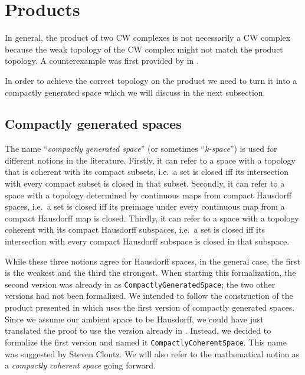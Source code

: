 \section{Products}\label{sec:products}

In general, the product of two CW complexes is not necessarily a CW complex because the weak topology of the CW complex might not match the product topology.
A counterexample was first provided by \citeauthor{Dowker1952} in \cite{Dowker1952}.

In order to achieve the correct topology on the product we need to turn it into a compactly generated space which we will discuss in the next subsection.

\subsection{Compactly generated spaces}

The name ``\emph{compactly generated space}'' (or sometimes ``\emph{k-space}'') is used for different notions in the literature.
Firstly, it can refer to a space with a topology that is coherent with its compact subsets, i.e.\ a set is closed iff its intersection with every compact subset is closed in that subset. 
Secondly, it can refer to a space with a topology determined by continuous maps from compact Hausdorff spaces, i.e.\ a set is closed iff its preimage under every continuous map from a compact Hausdorff map is closed. 
Thirdly, it can refer to a space with a topology coherent with its compact Hausdorff subspaces, i.e.\ a set is closed iff its intersection with every compact Hausdorff subspace is closed in that subspace. 

While these three notions agree for Hausdorff spaces, in the general case, the first is the weakest and the third the strongest. 
When starting this formalization, the second version was already in \mathlib as \lstinline|CompactlyGeneratedSpace|; the two other versions had not been formalized. 
We intended to follow the construction of the product presented in \cite{Hatcher2002} which uses the first version of compactly generated spaces. 
Since we assume our ambient space to be Hausdorff, we could have just translated the proof to use the version already in \mathlib. 
Instead, we decided to formalize the first version and named it \lstinline|CompactlyCoherentSpace|.
This name was suggested by Steven Clontz. 
We will also refer to the mathematical notion as a \emph{compactly coherent space} going forward.

